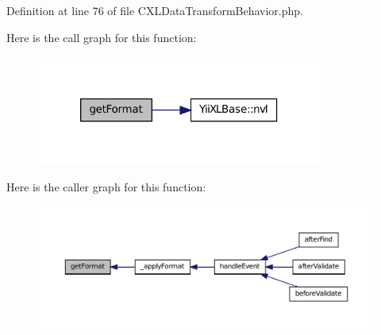 Definition at line 76 of file CXLDataTransformBehavior.php.








Here is the call graph for this function:\nopagebreak
\begin{figure}[H]
\begin{center}
\leavevmode
\includegraphics[width=266pt]{classCXLDataTransformBehavior_a5f5baa468a67090cc67aa9503fdbc6bb_cgraph}
\end{center}
\end{figure}




Here is the caller graph for this function:\nopagebreak
\begin{figure}[H]
\begin{center}
\leavevmode
\includegraphics[width=400pt]{classCXLDataTransformBehavior_a5f5baa468a67090cc67aa9503fdbc6bb_icgraph}
\end{center}
\end{figure}


